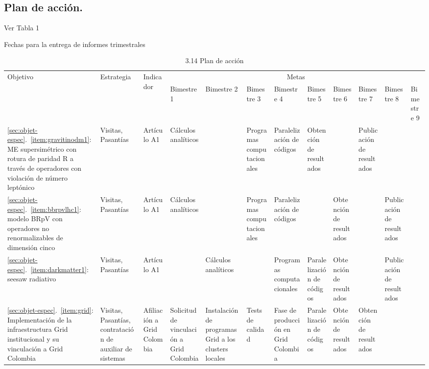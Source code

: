 \subsection{Plan de acción.}
Ver Tabla 1
\begin{evaluacion}
  Fechas para la entrega de informes trimestrales
\end{evaluacion}
\begin{sidewaystable}[htdp]
\footnotesize
\caption{3.14 Plan de acción}  %
\centering
\begin{tabular}{|p{2cm}|p{1.7cm}|p{1.45cm}|p{1.45cm}|p{1.45cm}|p{1.45cm}|p{1.45cm}|p{1.45cm}|p{1.45cm}|p{1.45cm}|p{1.45cm}|p{1.45cm}|}\hline
  \multirow{2}{*}{Objetivo} & \multirow{2}{*}{Estrategia} & \multirow{2}{*}{Indicador}  & \multicolumn{9}{|c|}{Metas}\\
\cline{4-12} 
& & & Bimestre 1 &Bimestre 2 & Bimestre 3& Bimestre 4& Bimestre 5& Bimestre 6& Bimestre 7& Bimestre 8& Bimestre 9\\\hline 
\ref{sec:objet-espec}.~\ref{item:gravitinodm1}: ME supersimétrico con
  rotura de paridad R a través de operadores con violación de número
  leptónico&Visitas, Pasantías&Artículo A1&Cálculos analíticos&&Programas computacionales&Pa\-ra\-le\-li\-za\-ción de códigos&Obtención de resultados&&Publicación de resultados&&\\\hline
\ref{sec:objet-espec}.~\ref{item:bbrpvlhc1}: modelo BRpV con operadores no renormalizables de dimensión cinco&Visitas, Pasantías&Artículo A1&Cálculos analíticos&&Programas computacionales&Pa\-ra\-le\-li\-za\-ción de códigos&&Obtención de resultados&&Publicación de resultados&\\\hline
\ref{sec:objet-espec}.~\ref{item:darkmatter1}: seesaw radiativo&Visitas, Pasantías&Artículo A1&&Cálculos analíticos&&Programas computacionales&Pa\-ra\-le\-li\-za\-ción de códigos&Obtención de resultados&&Publicación de resultados&\\\hline
\ref{sec:objet-espec}.~\ref{item:grid}: Implementación de la infraestructura Grid institucional y su vinculación a Grid Colombia&Visitas, Pasantías, contratación de auxiliar de sistemas&Afiliación a Grid Colombia&Solicitud de vinculación a Grid Colombia&Instalación de programas Grid a los clusters locales&Tests de calidad&Fase de producción en Grid Colombia&Pa\-ra\-le\-li\-za\-ción de códigos&Obtención de resultados&Obtención de resultados&&\\\hline
\end{tabular}
\label{tab:LPer}
\end{sidewaystable}


